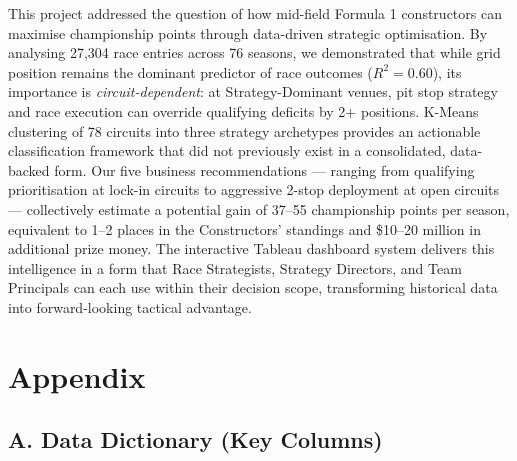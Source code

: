 \documentclass[12pt, a4paper]{article}
\begin{document}
This project addressed the question of how mid-field Formula 1 constructors can maximise championship points through data-driven strategic optimisation. By analysing 27,304 race entries across 76 seasons, we demonstrated that while grid position remains the dominant predictor of race outcomes ($R^2 = 0.60$), its importance is \textit{circuit-dependent}: at Strategy-Dominant venues, pit stop strategy and race execution can override qualifying deficits by 2+ positions. K-Means clustering of 78 circuits into three strategy archetypes provides an actionable classification framework that did not previously exist in a consolidated, data-backed form. Our five business recommendations --- ranging from qualifying prioritisation at lock-in circuits to aggressive 2-stop deployment at open circuits --- collectively estimate a potential gain of 37--55 championship points per season, equivalent to 1--2 places in the Constructors' standings and \$10--20 million in additional prize money. The interactive Tableau dashboard system delivers this intelligence in a form that Race Strategists, Strategy Directors, and Team Principals can each use within their decision scope, transforming historical data into forward-looking tactical advantage.

\newpage

\section*{Appendix}

\subsection*{A. Data Dictionary (Key Columns)}
\end{document}
